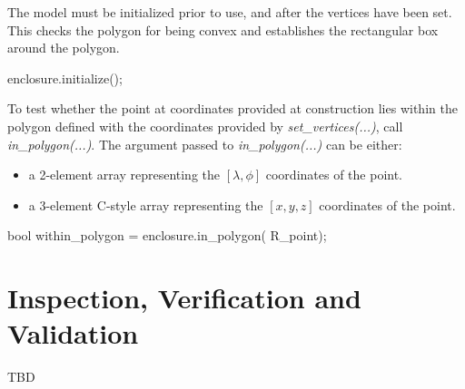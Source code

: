 \documentclass[11pt,fleqn]{report}
\begin{document}
\begin{code}
double enclosure_vertices[6][2] = {...};
...
enclosure.set_vertices{ enclosure_vertices);
\end{code}

The model must be initialized prior to use, and after the vertices have been
set. This checks the polygon for being convex and establishes the
rectangular box around the polygon.
\begin{code}
enclosure.initialize();
\end{code}

To test whether the point at coordinates provided at construction lies
within the polygon defined with the coordinates provided by
\textit{set\_vertices(...)}, call \textit{in\_polygon(...)}.
The argument passed to \textit{in\_polygon(...)} can be either:
\begin{itemize}
  \item a 2-element array representing the $[\lambda, \phi]$ coordinates of
     the point.
  \item a 3-element C-style array representing the $[x,y,z]$ coordinates
    of the point.
\end{itemize}


\begin{code}
bool within_polygon = enclosure.in_polygon( R_point);
\end{code}


\chapter{Inspection, Verification and Validation}
TBD
\end{document}
